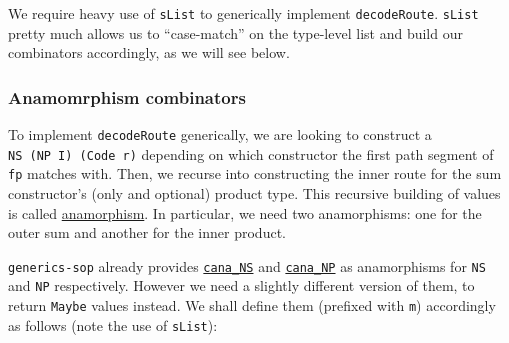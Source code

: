 \begin{Shaded}
\begin{Highlighting}[]
 \OtherTok{ ::}\NormalTok{ [k] }\OtherTok{{-}\textgreater{}}  
  \OtherTok{  ::} \NormalTok{ \textquotesingle{}[]}
  \OtherTok{ ::} \OtherTok{=\textgreater{}} \OperatorTok{:}

\CommentTok{{-}{-}}
 \OtherTok{=\textgreater{}} 
\OtherTok{=} 
\end{Highlighting}
\end{Shaded}

We require heavy use of \texttt{sList} to generically implement
\texttt{decodeRoute}. \texttt{sList} pretty much allows us to
``case-match'' on the type-level list and build our combinators
accordingly, as we will see below.

\hypertarget{anamomrphism-combinators}{%
\subsubsection{Anamomrphism
combinators}\label{anamomrphism-combinators}}

To implement \texttt{decodeRoute} generically, we are looking to
construct a \texttt{NS\ (NP\ I)\ (Code\ r)} depending on which
constructor the first path segment of \texttt{fp} matches with. Then, we
recurse into constructing the inner route for the sum constructor's
(only and optional) product type. This recursive building of values is
called
\href{https://en.wikipedia.org/wiki/Anamorphism\#Anamorphisms_in_functional_programming}{anamorphism}.
In particular, we need two anamorphisms: one for the outer sum and
another for the inner product.

\texttt{generics-sop} already provides
\href{https://hackage.haskell.org/package/sop-core-0.5.0.2/docs/Data-SOP-NS.html\#v:cana_NS}{\texttt{cana\_NS}}
and
\href{https://hackage.haskell.org/package/sop-core-0.5.0.2/docs/Data-SOP-NP.html\#v:cana_NP}{\texttt{cana\_NP}}
as anamorphisms for \texttt{NS} and \texttt{NP} respectively. However we
need a slightly different version of them, to return \texttt{Maybe}
values instead. We shall define them (prefixed with \texttt{m})
accordingly as follows (note the use of \texttt{sList}):


